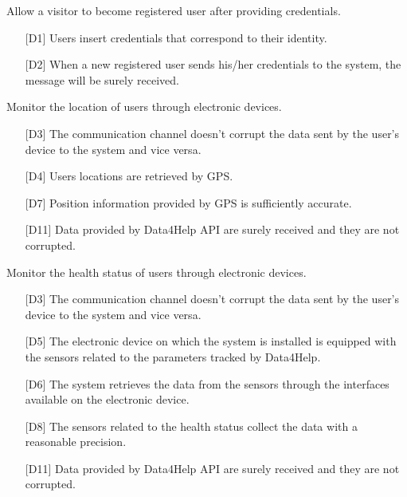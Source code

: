 \begin{enumerate} [resume, label={[G\arabic*]}]
    \item Allow a visitor to become registered user after providing credentials.
        \begin{itemize}
            \item [{[D1]}] Users insert credentials that correspond to their identity.
            \item [{[D2]}] When a new registered user sends his/her credentials to the system, the message will be surely received.
        \end{itemize}
        
    \item Monitor the location of users through electronic devices.
        \begin{itemize}
            \item [{[D3]}] The communication channel doesn't corrupt the data sent by the user's device to the system and vice versa.
            \item [{[D4]}] Users locations are retrieved by GPS.
            \item [{[D7]}] Position information provided by GPS is sufficiently accurate.
            \item [{[D11]}] Data  provided  by  Data4Help  API  are  surely  received  and  they  are  not corrupted.
        \end{itemize}
        
    \item Monitor the health status of users through electronic devices.
        \begin{itemize}
            \item [{[D3]}] The communication channel doesn't corrupt the data sent by the user's device to the system and vice versa.
            \item [{[D5]}] The electronic device on which the system is installed is equipped with the sensors related to the parameters tracked by Data4Help.
            \item [{[D6]}] The  system  retrieves  the  data  from  the  sensors  through  the  interfaces available on the electronic device.
            \item [{[D8]}] The sensors related to the health status collect the data with a reasonable precision.
            \item [{[D11]}] Data  provided  by  Data4Help  API  are  surely  received  and  they  are  not corrupted.
        \end{itemize}
        

\end{enumerate}
